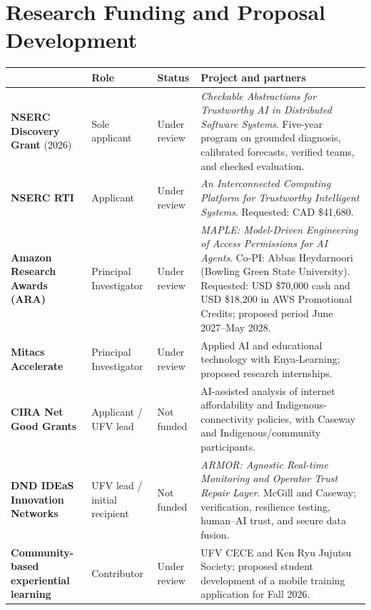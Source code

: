 \documentclass[10pt,letterpaper]{article}
\newcommand{\cvtablehead}[1]{{\color{mbblue}\sffamily\bfseries #1}}
\newenvironment{cvtable}{%
 \begingroup\fontsize{9.2}{11.3}\selectfont
 \setlength{\tabcolsep}{5pt}\renewcommand{\arraystretch}{1.16}
%
}{\par\endgroup}
\begin{document}
\section{Research Funding and Proposal Development}
\begin{cvtable}
\begin{tabularx}{\textwidth}{@{}>{\raggedright\arraybackslash}p{3.0cm}>{\raggedright\arraybackslash}p{2.3cm}>{\raggedright\arraybackslash}p{2.1cm}>{\raggedright\arraybackslash}X@{}}
\toprule
\cvtablehead{Program or proposal} & \cvtablehead{Role} & \cvtablehead{Status} & \cvtablehead{Project and partners}\\\midrule
\textbf{NSERC Discovery Grant} (2026) & Sole applicant & Under review & \emph{Checkable Abstractions for Trustworthy AI in Distributed Software Systems}. Five-year program on grounded diagnosis, calibrated forecasts, verified teams, and checked evaluation.\\\addlinespace[3pt]
\textbf{NSERC RTI} & Applicant & Under review & \emph{An Interconnected Computing Platform for Trustworthy Intelligent Systems}. Requested: CAD \$41,680.\\\addlinespace[3pt]
\textbf{Amazon Research Awards (ARA)} & Principal Investigator & Under review & \emph{MAPLE: Model-Driven Engineering of Access Permissions for AI Agents}. Co-PI: Abbas Heydarnoori (Bowling Green State University). Requested: USD \$70,000 cash and USD \$18,200 in AWS Promotional Credits; proposed period June 2027--May 2028.\\\addlinespace[3pt]
\textbf{Mitacs Accelerate} & Principal Investigator & Under review & Applied AI and educational technology with Enya-Learning; proposed research internships.\\\addlinespace[3pt]
\textbf{CIRA Net Good Grants} & Applicant / UFV lead & Not funded & AI-assisted analysis of internet affordability and Indigenous-connectivity policies, with Caseway and Indigenous/community participants.\\\addlinespace[3pt]
\textbf{DND IDEaS Innovation Networks} & UFV lead / initial recipient & Not funded & \emph{ARMOR: Agnostic Real-time Monitoring and Operator Trust Repair Layer}. McGill and Caseway; verification, resilience testing, human--AI trust, and secure data fusion.\\\addlinespace[3pt]
\textbf{Community-based experiential learning} & Contributor & Under review & UFV CECE and Ken Ryu Jujutsu Society; proposed student development of a mobile training application for Fall 2026.\\\bottomrule
\end{tabularx}
\end{cvtable}
\end{document}
